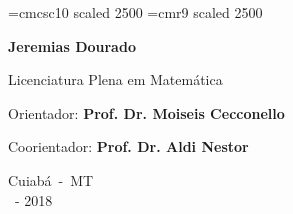 \vspace{4cm} 

\font\fontGrande=cmcsc10 scaled 2500
\font\pessoal=cmr9 scaled 2500

\begin{center}
\end{center}

\begin{center}

\normalsize \vspace{3cm}

{\large {\bf Jeremias Dourado}}

{\footnotesize{Licenciatura Plena em Matem\'{a}tica}}

\vspace{3cm}

Orientador: {\bf Prof. Dr. Moiseis Cecconello}

Coorientador: {\bf Prof. Dr. Aldi Nestor}


\vspace{4cm}

{\footnotesize{Cuiab\'a~-~MT\\\mes \ - 2018}}
\end{center}

%